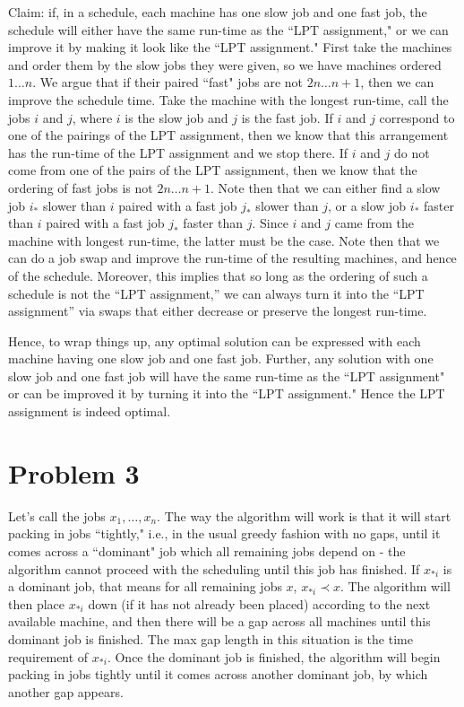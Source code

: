 \documentclass{article}
\begin{document}
Claim: if, in a schedule, each machine has one slow job and one fast job, the schedule will either have the same run-time as the ``LPT assignment," or we can improve it by making it look like the ``LPT assignment." First take the machines and order them by the slow jobs they were given, so we have machines ordered $1 \ldots n$. We argue that if their paired ``fast" jobs are not $2n \ldots n+1$, then we can improve the schedule time. Take the machine with the longest run-time, call the jobs $i$ and $j$, where $i$ is the slow job and $j$ is the fast job. If $i$ and $j$ correspond to one of the pairings of the LPT assignment, then we know that this arrangement has the run-time of the LPT assignment and we stop there. If $i$ and $j$ do not come from one of the pairs of the LPT assignment, then we know that the ordering of fast jobs is not $2n \ldots n+1$. Note then that we can either find a slow job $i_*$ slower than $i$ paired with a fast job $j_*$ slower than $j$, or a slow job $i_*$ faster than $i$ paired with a fast job $j_*$ faster than $j$. Since $i$ and $j$ came from the machine with longest run-time, the latter must be the case. Note then that we can do a job swap and improve the run-time of the resulting machines, and hence of the schedule. Moreover, this implies that so long as the ordering of such a schedule is not the ``LPT assignment,'' we can always turn it into the ``LPT assignment'' via swaps that either decrease or preserve the longest run-time.

Hence, to wrap things up, any optimal solution can be expressed with each machine having one slow job and one fast job. Further, any solution with one slow job and one fast job will have the same run-time as the ``LPT assignment" or can be improved it by turning it into the ``LPT assignment." Hence the LPT assignment is indeed optimal.

\section*{Problem 3}

Let's call the jobs $x_1, \ldots, x_n$. The way the algorithm will work is that it will start packing in jobs ``tightly," i.e., in the usual greedy fashion with no gaps, until it comes across a ``dominant" job which all remaining jobs depend on - the algorithm cannot proceed with the scheduling until this job has finished. If $x_{*i}$ is a dominant job, that means for all remaining jobs $x$, $x_{*i} \prec x$. The algorithm will then place $x_{*i}$ down (if it has not already been placed) according to the next available machine, and then there will be a gap across all machines until this dominant job is finished. The max gap length in this situation is the time requirement of $x_{*i}$. Once the dominant job is finished, the algorithm will begin packing in jobs tightly until it comes across another dominant job, by which another gap appears.
\end{document}
